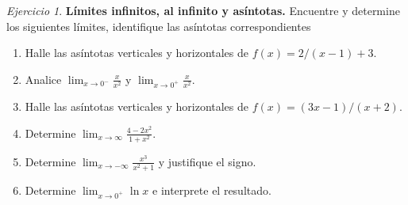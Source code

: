 \documentclass[12pt]{article}
\theoremstyle{remark}
\newtheorem{Ejer}{Ejercicio}
\begin{document}
\begin{Ejer}\textbf{Límites infinitos, al infinito y asíntotas.} Encuentre y determine los siguientes l\'imites, identifique las as\'intotas correspondientes
\begin{enumerate}[resume=banco]
\item Halle las asíntotas verticales y horizontales de $f(x)=2/(x-1)+3$.
\item Analice $\displaystyle\lim_{x\to0^-}\frac{x}{x^2}$ y $\displaystyle\lim_{x\to0^+}\frac{x}{x^2}$.
\item Halle las asíntotas verticales y horizontales de $f(x)=(3x-1)/(x+2)$.
\item Determine $\displaystyle\lim_{x\to\infty}\frac{4-2x^2}{1+x^2}$.
\item Determine $\displaystyle\lim_{x\to-\infty}\frac{x^3}{x^2+1}$ y justifique el signo.
\item Determine $\displaystyle\lim_{x\to0^+}\ln x$ e interprete el resultado.
\end{enumerate}
\end{Ejer}
\end{document}
